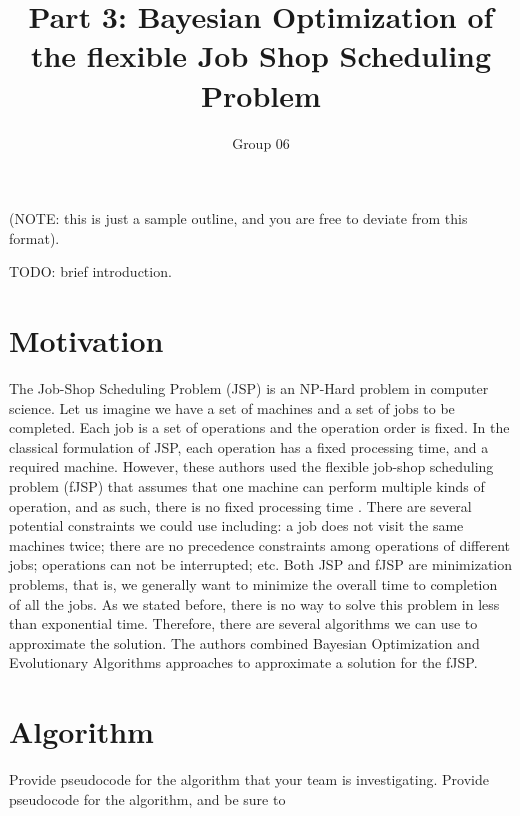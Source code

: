 \documentclass[11pt]{article}
\title{Part 3: Bayesian Optimization of the flexible Job Shop Scheduling Problem}
\author{Group 06}
\begin{document}
\maketitle

(NOTE: this is just a sample outline, and you are free to deviate from this 
format).

TODO: brief introduction.

\section{Motivation}
The Job-Shop Scheduling Problem (JSP) is an NP-Hard problem in computer science\cite{cheng1996tutorial}. Let us imagine we have a set of machines and a set of jobs to be completed. Each job is a set of operations and the operation order is fixed. In the classical formulation of JSP, each operation has a fixed processing time, and a required machine. However, these authors used the flexible job-shop scheduling problem (fJSP) that assumes that one machine can perform multiple kinds of operation, and as such, there is no fixed processing time \cite{sun2015bayesian}. There are several potential constraints we could use including: a job does not visit the same machines twice; there are no precedence constraints among operations of different jobs; operations can not be interrupted; etc. Both JSP and fJSP are minimization problems, that is, we generally want to minimize the overall time to completion of all the jobs. As we stated before, there is no way to solve this problem in less than exponential time. Therefore, there are several algorithms we can use to approximate the solution. The authors combined Bayesian Optimization and Evolutionary Algorithms approaches to approximate a solution for the fJSP. 

\section{Algorithm}
Provide pseudocode for the algorithm that your team is investigating.  Provide 
pseudocode for the algorithm, and be sure to 
\end{document}
